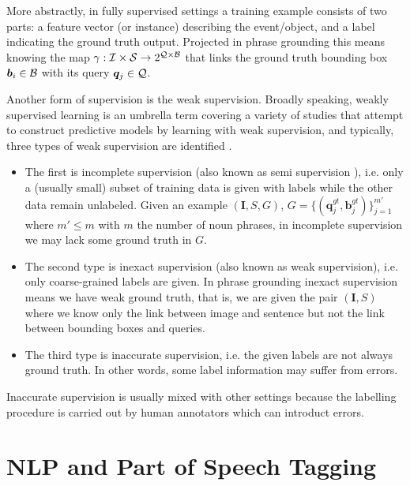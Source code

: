 More abstractly, in fully supervised settings a training example
consists of two parts: a feature vector (or instance) describing the
event/object, and a label indicating the ground truth output.
Projected in phrase grounding this means knowing the map $\gamma :
\mathcal{I} \times \mathcal{S} \rightarrow 2^{\mathcal{Q} \times \mathcal{B}}$ that links the
ground truth bounding box $\bm{b}_i \in \mathcal{B}$ with its query
$\bm{q}_j \in \mathcal{Q}$.

Another form of supervision is the weak supervision. Broadly speaking,
weakly supervised learning is an umbrella term covering a variety of
studies that attempt to construct predictive models by learning with
weak supervision, and typically, three types of weak supervision are
identified \cite{zhou2018brief}.

\begin{itemize}
  \item The first is incomplete supervision (also known as semi
supervision \cite{rohrbach2016grounding}), i.e. only a (usually small)
subset of training data is given with labels while the other data
remain unlabeled. Given an example $(\bm{I}, S, G)$, $G = \{
(\bm{q}^{gt}_j, \bm{b}^{gt}_j) \}^{m'}_{j=1}$ where $m' \leq m$ with
$m$ the number of noun phrases, in incomplete supervision we may lack
some ground truth in $G$.
  \item The second type is inexact supervision (also known as weak
supervision), i.e. only coarse-grained labels are given. In phrase
grounding inexact supervision means we have weak ground truth, that
is, we are given the pair $(\bm{I}, S)$ where we know only the link
between image and sentence but not the link between bounding boxes and
queries.
  \item The third type is inaccurate supervision, i.e. the given
labels are not always ground truth. In other words, some label
information may suffer from errors.
\end{itemize}

Inaccurate supervision is usually mixed with other settings because
the labelling procedure is carried out by human annotators which can
introduct errors.

\section{NLP and Part of Speech Tagging}

